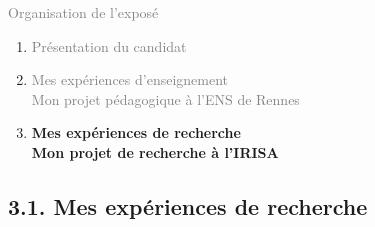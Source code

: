 \documentclass[11pt,english,ignorenonframetext,]{beamer}
\begin{document}
\begin{frame}{\textcolor{gray}{Organisation de l'exposé}}

\begin{enumerate}
  \item
\textcolor{gray}{
  Présentation du candidat
}
\vspace*{25pt}


\item
\textcolor{gray}{
  Mes expériences d'enseignement\\
  Mon projet pédagogique à l'ENS de Rennes
}
\vspace*{25pt}

\item
\alert{\textbf{%
  Mes expériences de recherche\\
  Mon projet de recherche à l'IRISA
}}
\end{enumerate}

\end{frame}


\subsection{\hfill{}3.1. Mes expériences de recherche\hfill{}}
\end{document}
